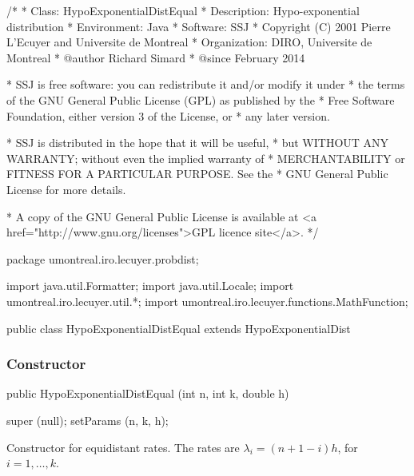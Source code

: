 \begin{code}\begin{hide}
/*
 * Class:        HypoExponentialDistEqual
 * Description:  Hypo-exponential distribution
 * Environment:  Java
 * Software:     SSJ
 * Copyright (C) 2001  Pierre L'Ecuyer and Universite de Montreal
 * Organization: DIRO, Universite de Montreal
 * @author       Richard Simard
 * @since        February 2014

 * SSJ is free software: you can redistribute it and/or modify it under
 * the terms of the GNU General Public License (GPL) as published by the
 * Free Software Foundation, either version 3 of the License, or
 * any later version.

 * SSJ is distributed in the hope that it will be useful,
 * but WITHOUT ANY WARRANTY; without even the implied warranty of
 * MERCHANTABILITY or FITNESS FOR A PARTICULAR PURPOSE.  See the
 * GNU General Public License for more details.

 * A copy of the GNU General Public License is available at
   <a href="http://www.gnu.org/licenses">GPL licence site</a>.
 */
\end{hide}
package umontreal.iro.lecuyer.probdist;
\begin{hide}
import java.util.Formatter;
import java.util.Locale;
import umontreal.iro.lecuyer.util.*;
import umontreal.iro.lecuyer.functions.MathFunction;\end{hide}

public class HypoExponentialDistEqual extends HypoExponentialDist\begin{hide} {
   private double m_h;
   private int m_n;
   private int m_k;
\end{hide}
\end{code}
\subsubsection* {Constructor}

\begin{code}

   public HypoExponentialDistEqual (int n, int k, double h)\begin{hide} {
      super (null);
      setParams (n, k, h);
   }\end{hide}
\end{code}
  \begin{tabb} Constructor for equidistant rates.
  The rates are $\lambda_i = (n+1-i)h$, for $i = 1,\ldots,k$.
  \end{tabb}
\begin{htmlonly}
\end{htmlonly}


